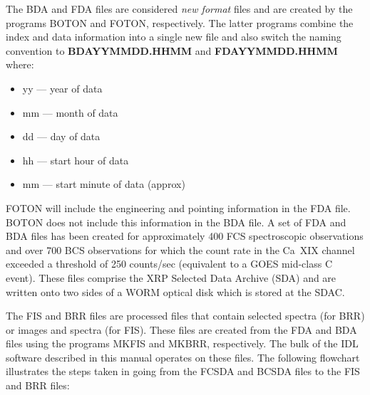 The BDA and FDA files are considered {\it new format} files and are created  by
the programs BOTON and FOTON, respectively. The latter programs  combine the
index and data information into a single new file and also switch  the naming
convention to {\bf BDAYYMMDD.HHMM} and {\bf FDAYYMMDD.HHMM} where:

\begin{itemize}
\item     yy  --- year of data
\item     mm  --- month of data
\item     dd  --- day of data
\item     hh  --- start hour of data
\item     mm  --- start minute of data (approx)
\end{itemize}

FOTON will include the engineering and pointing information in the FDA file.
BOTON does not include this information in the BDA file. A set of FDA and BDA
files has been created  for approximately 400 FCS spectroscopic observations
and over 700 BCS observations for which the count rate in the Ca~XIX channel
exceeded  a threshold of 250 counts/sec (equivalent to a GOES mid-class C
event). These files comprise the XRP Selected Data Archive (SDA) and are
written onto two sides of a WORM optical disk which is stored at the SDAC.

The FIS and BRR files  are processed files that contain selected spectra (for
BRR) or images and spectra (for FIS). These files are created from the FDA and
BDA files using the programs MKFIS and MKBRR, respectively. The bulk of the IDL
software described in this manual operates on these files. The following
flowchart illustrates the steps taken in going from the FCSDA and BCSDA files
to the FIS and BRR files:


